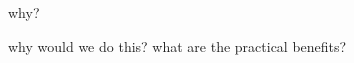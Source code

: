 \begin{frame}
\begin{block}{why?}
\begin{center}
why would we do this? what are the practical benefits?
\end{center}
\end{block}
\end{frame}
